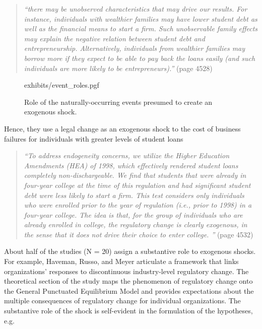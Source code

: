 \documentclass[11pt]{article}
\begin{document}
\begin{refsection}
\begin{quote}
  \textit{
  ``there may be unobserved characteristics that may drive our results. For
  instance, individuals with wealthier families may have lower student debt as
  well as the financial means to start a firm. Such unobservable family effects
  may explain the negative relation between student debt and entrepreneurship.
  Alternatively, individuals from wealthier families may borrow more if they
  expect to be able to pay back the loans easily (and such individuals are more
  likely to be entrepreneurs).''
  }
  (page 4528)
\end{quote}

\begin{figure}[!htbp]
    \centering
    {exhibits/event_roles.pgf}
    \caption{Role of the naturally-occurring events presumed to create
    an exogenous shock.}
    \label{fig:event_roles}
\end{figure}

Hence, they use a legal change as an exogenous shock to the cost of business 
failures for individuals with greater levels of student loans

\begin{quote}
  \textit{
  ``To address endogeneity concerns, we utilize the Higher Education Amendments
  (HEA) of 1998, which effectively rendered student loans completely
  non-dischargeable. We find that students that were already in four-year
  college at the time of this regulation and had significant student debt were
  less likely to start a firm. This test considers only individuals who were
  enrolled prior to the year of regulation (i.e., prior to 1998) in a four-year
  college.  The idea is that, for the group of individuals who are already
  enrolled in college, the regulatory change is clearly exogenous, in the sense
  that it does not drive their choice to enter college. ''
  }
  (page 4532)
\end{quote}

About half of the studies (N = 20) assign a substantive role to exogenous
shocks.  For example, Haveman, Russo, and Meyer \autocite*{haveman2001253} 
articulate a framework that links organizations' responses to discontinuous
industry-level regulatory change. The theoretical section of the study maps the
phenomenon of regulatory change onto the General Punctuated Equilibrium Model
and provides expectations about the multiple consequences of regulatory change
for individual organizations. The substantive role of the shock is self-evident
in the formulation of the hypotheses, e.g.


\end{refsection}
\end{document}
